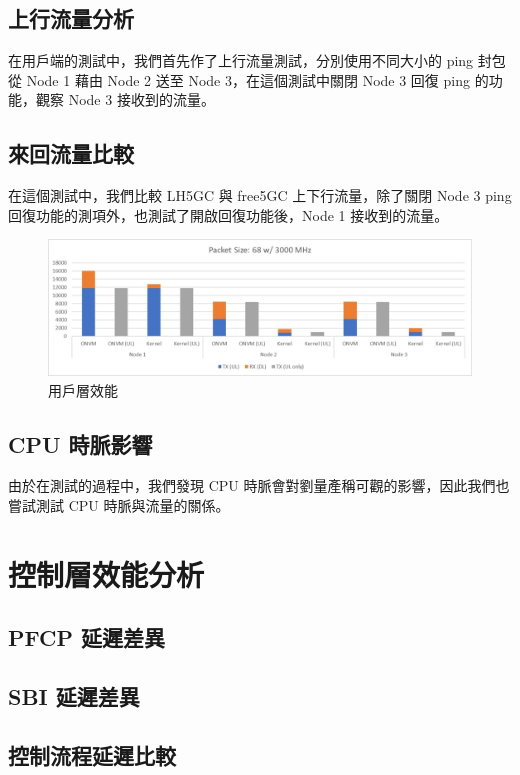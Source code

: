 \subsection{上行流量分析}
\label{subsec:uplink_evaluation}

在用戶端的測試中，我們首先作了上行流量測試，分別使用不同大小的 ping 封包從 Node 1 藉由 Node 2 送至 Node 3，在這個測試中關閉 Node 3 回復 ping 的功能，觀察 Node 3 接收到的流量。

\subsection{來回流量比較}
\label{subsec:uldl_comp}

在這個測試中，我們比較 LH5GC 與 free5GC 上下行流量，除了關閉 Node 3 ping 回復功能的測項外，也測試了開啟回復功能後，Node 1 接收到的流量。

\begin{figure}[htb]
  \centering
  \includegraphics[height=!,width=1\linewidth,keepaspectratio=true]{figures/user_plan_performance}
  \caption[用戶層效能]{{\footnotesize 用戶層效能}}
  \label{fig:user_plan_performance}
\end{figure}

\subsection{CPU 時脈影響}
\label{subsec:cpu_clock}

由於在測試的過程中，我們發現 CPU 時脈會對劉量產稱可觀的影響，因此我們也嘗試測試 CPU 時脈與流量的關係。

\section{控制層效能分析}
\label{sec:cp_evaluation}

\subsection{PFCP 延遲差異}
\label{subsec:pfcp_comp}

\subsection{SBI 延遲差異}
\label{subsec:sbi_comp}

\subsection{控制流程延遲比較}
\label{subsec:cp_proc_comp}
